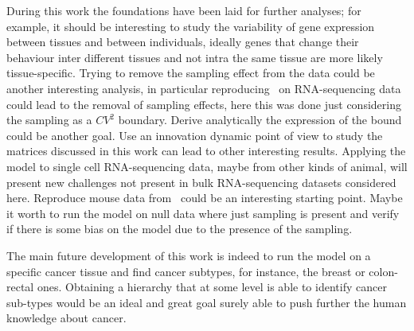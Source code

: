 During this work the foundations have been laid for further analyses; for example, it should be interesting to study the variability of gene expression between tissues and between individuals, ideally genes that change their behaviour inter different tissues and not intra the same tissue are more likely tissue-specific. Trying to remove the sampling effect from the data could be another interesting analysis, in particular reproducing~\cite{Grilli} on RNA-sequencing data could lead to the removal of sampling effects, here this was done just considering the sampling as a $CV^2$ boundary. Derive analytically the expression of the bound could be another goal. Use an innovation dynamic point of view to study the matrices discussed in this work can lead to other interesting results. Applying the model to single cell RNA-sequencing data, maybe from other kinds of animal, will present new challenges not present in bulk RNA-sequencing datasets considered here. Reproduce mouse data from~\cite{Scialdone2016} could be an interesting starting point. Maybe it worth to run the model on null data where just sampling is present and verify if there is some bias on the model due to the presence of the sampling.

The main future development of this work is indeed to run the model on a specific cancer tissue and find cancer subtypes, for instance, the breast or colon-rectal ones. Obtaining a hierarchy that at some level is able to identify cancer sub-types would be an ideal and great goal surely able to push further the human knowledge about cancer. 